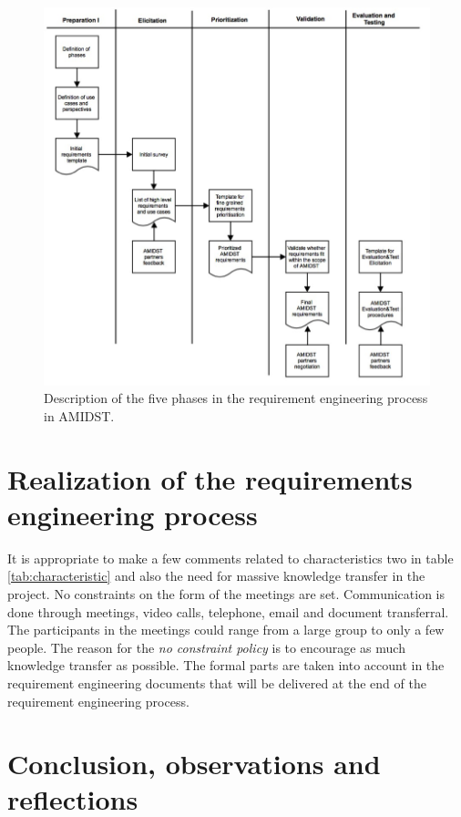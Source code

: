 \documentclass[11pt, oneside]{article}   	%
\begin{document}
\begin{figure}
\centering
\includegraphics [keepaspectratio,width = 14cm] {REprocess1}
\caption{Description of the five phases in the requirement engineering process in AMIDST.}
\label{REprocess1}
\end{figure}

\section{Realization of the requirements engineering process}
\label{sec:realization}

It is appropriate to make a few comments related to characteristics two in table \ref{tab:characteristic} and also the need for massive knowledge transfer in the project.  No constraints on the form of the meetings are set.  Communication is done through meetings, video calls, telephone, email and document transferral.  The participants in the meetings could range from a large group to only a few people.  The reason for the \emph{no constraint policy} is to encourage as much knowledge transfer as possible.  The formal parts are taken into account in the requirement engineering documents that will be delivered at the end of the requirement engineering process. 


\section{Conclusion, observations and reflections}
\label{sec:conclusion}
\end{document}
